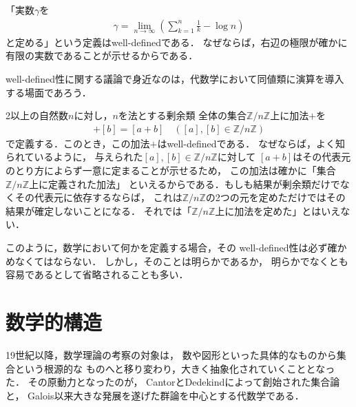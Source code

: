   \begin{ex}
    「実数$\gamma$を
    \begin{align*}
      \gamma = \lim_{n \to \infty} \left( \sum_{k=1}^{n} \frac{1}{k} - \log n \right)  
    \end{align*}
    と定める」という定義はwell-definedである．
    なぜならば，右辺の極限が確かに有限の実数であることが示せるからである．
  \end{ex}
  well-defined性に関する議論で身近なのは，代数学において同値類に演算を導入する場面であろう．
  \begin{ex}
    2以上の自然数$n$に対し，$n$を法とする剰余類
    全体の集合$\mathbb{Z} / n \mathbb{Z}$上に加法$+$を
    \begin{align*}
      [a] + [b] = [ a+b ] \quad \left( [a] , [b] \in \mathbb{Z} / n \mathbb{Z} \right)
    \end{align*}
    で定義する．このとき，この加法$+$はwell-definedである．
    なぜならば，よく知られているように，
    与えられた$[a] , [b] \in \mathbb{Z} / n \mathbb{Z}$に対して
    $[a+ b]$はその代表元のとり方によらず一意に定まることが示せるため，
    この加法は確かに「集合$\mathbb{Z}/n \mathbb{Z}$上に定義された加法」
    といえるからである．もしも結果が剰余類だけでなくその代表元に依存するならば，
    これは$\mathbb{Z} / n \mathbb{Z}$の2つの元を定めただけではその結果が確定しないことになる．
    それでは「$\mathbb{Z}/ n \mathbb{Z}$上に加法を定めた」とはいえない．
  \end{ex}

  このように，数学において何かを定義する場合，その
  well-defined性は必ず確かめなくてはならない．
  しかし，そのことは明らかであるか，
  明らかでなくとも容易であるとして省略されることも多い．

\section{数学的構造}
\label{sec:structure}
  19世紀以降，数学理論の考察の対象は，
  数や図形といった具体的なものから集合という根源的な
  ものへと移り変わり，大きく抽象化されていくこととなった．
  その原動力となったのが，
  CantorとDedekindによって創始された集合論と，
  Galois以来大きな発展を遂げた群論を中心とする代数学である．
  

